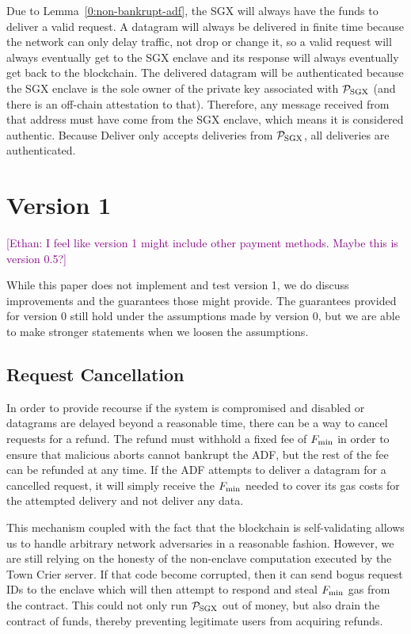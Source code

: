 \documentclass[letterpaper,twocolumn,10pt]{article}
\newcommand{\ethan}[1]{\textcolor{purple}{[\textsf{Ethan: #1}]}}
\begin{document}
Due to Lemma~\ref{0:non-bankrupt-adf}, the SGX will always have the funds to deliver a valid request.
A datagram will always be delivered in finite time because the network can only delay traffic, not drop or change it,
so a valid request will always eventually get to the SGX enclave and its response will always eventually get back to the blockchain.
The delivered datagram will be authenticated because the SGX enclave is the sole owner of the private key associated with $\mathcal{P}_{\rm SGX}$ (and there is an off-chain attestation to that).
Therefore, any message received from that address must have come from the SGX enclave, which means it is considered authentic.
Because Deliver only accepts deliveries from $\mathcal{P}_{\rm SGX}$, all deliveries are authenticated.




\section{Version 1}

\ethan{I feel like version 1 might include other payment methods. Maybe this is version 0.5?}

While this paper does not implement and test version 1, we do discuss improvements and the guarantees those might provide.
The guarantees provided for version 0 still hold under the assumptions made by version 0, but we are able to make stronger statements when we loosen the assumptions.


\subsection{Request Cancellation}

In order to provide recourse if the system is compromised and disabled or datagrams are delayed beyond a reasonable time,
there can be a way to cancel requests for a refund.
The refund must withhold a fixed fee of $F_{\rm min}$ in order to ensure that malicious aborts cannot bankrupt the ADF, but the rest of the fee can be refunded at any time.
If the ADF attempts to deliver a datagram for a cancelled request, it will simply receive the $F_{\rm min}$ needed to cover its gas costs for the attempted delivery and not deliver any data.

This mechanism coupled with the fact that the blockchain is self-validating allows us to handle arbitrary network adversaries in a reasonable fashion.
However, we are still relying on the honesty of the non-enclave computation executed by the Town Crier server.
If that code become corrupted, then it can send bogus request IDs to the enclave which will then attempt to respond and steal $F_{\rm min}$ gas from the contract.
This could not only run $\mathcal{P}_{\rm SGX}$ out of money, but also drain the contract of funds, thereby preventing legitimate users from acquiring refunds.
\end{document}
